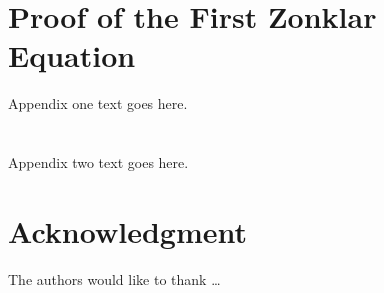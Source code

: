 \documentclass[journal,transmag]{IEEEtran}
\begin{document}
%


\appendices{}
\section{Proof of the First Zonklar Equation}
Appendix one text goes here.

\section{}
Appendix two text goes here.


\section*{Acknowledgment}


The authors would like to thank \ldots


\ifCLASSOPTIONcaptionsoff{}
\newpage
\fi







%
\end{document}
